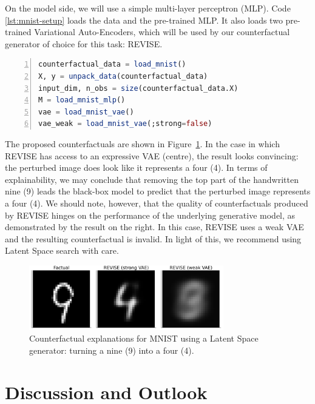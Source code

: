 \documentclass{juliacon}
\begin{document}
On the model side, we will use a simple multi-layer perceptron (MLP).
Code \ref{lst:mnist-setup} loads the data and the pre-trained MLP. It
also loads two pre-trained Variational Auto-Encoders, which will be used
by our counterfactual generator of choice for this task: REVISE.

\begin{lstlisting}[language=Julia, escapechar=@, numbers=left, label={lst:mnist-setup}, caption={Loading pre-trained models and data for MNIST.}]
counterfactual_data = load_mnist()
X, y = unpack_data(counterfactual_data)
input_dim, n_obs = size(counterfactual_data.X)
M = load_mnist_mlp()
vae = load_mnist_vae()
vae_weak = load_mnist_vae(;strong=false)
\end{lstlisting}

The proposed counterfactuals are shown in Figure~\ref{fig-mnist}. In the
case in which REVISE has access to an expressive VAE (centre), the
result looks convincing: the perturbed image does look like it
represents a four (4). In terms of explainability, we may conclude that
removing the top part of the handwritten nine (9) leads the black-box
model to predict that the perturbed image represents a four (4). We
should note, however, that the quality of counterfactuals produced by
REVISE hinges on the performance of the underlying generative model, as
demonstrated by the result on the right. In this case, REVISE uses a
weak VAE and the resulting counterfactual is invalid. In light of this,
we recommend using Latent Space search with care.

\begin{figure}

{\centering \includegraphics[width=3.33333in,height=1.11111in]{www/mnist_9to4_latent.png}

}

\caption{\label{fig-mnist}Counterfactual explanations for MNIST using a
Latent Space generator: turning a nine (9) into a four (4).}

\end{figure}

\hypertarget{sec-outlook}{%
\section{Discussion and Outlook}\label{sec-outlook}}
\end{document}
